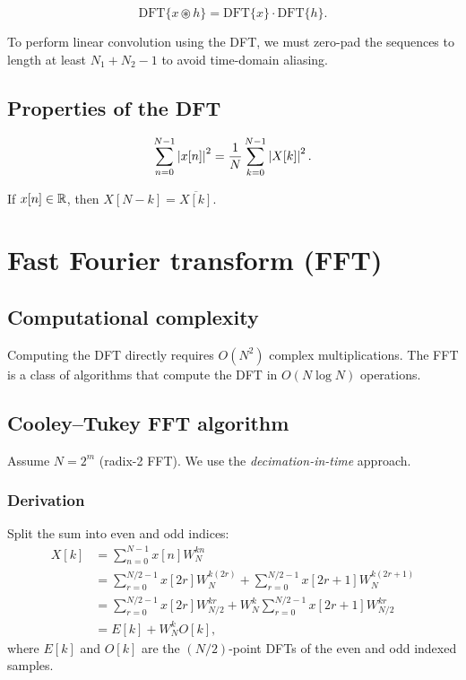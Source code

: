 \begin{notechapter}
\begin{theorem}\label{fourier-analysis:thm:circular-convolution}
\[
\text{DFT}\{x \circledast h\} = \text{DFT}\{x\} \cdot \text{DFT}\{h\}.
\]
\end{theorem}

\begin{remark}
To perform linear convolution using the DFT, we must zero-pad the sequences to length at least $N_1 + N_2 - 1$ to avoid time-domain aliasing.
\end{remark}

\subsection{Properties of the DFT}

\begin{proposition}
\[
\sum_{n=0}^{N-1} \left|x[n]\right|^2 = \frac{1}{N} \sum_{k=0}^{N-1} \left|X[k]\right|^2.
\]
\end{proposition}

\begin{proposition}
If $x[n] \in \mathbb{R}$, then $X[N-k] = \overline{X[k]}$.
\end{proposition}

\section{Fast Fourier transform (FFT)}

\subsection{Computational complexity}

Computing the DFT directly requires $O(N^2)$ complex multiplications. The FFT is a class of algorithms that compute the DFT in $O(N \log N)$ operations.

\subsection{Cooley--Tukey FFT algorithm}

Assume $N = 2^m$ (radix-2 FFT). We use the \emph{decimation-in-time} approach.

\subsubsection{Derivation}

Split the sum into even and odd indices:
\begin{align*}
X[k] &= \sum_{n=0}^{N-1} x[n] W_N^{kn} \\
&= \sum_{r=0}^{N/2-1} x[2r] W_N^{k(2r)} + \sum_{r=0}^{N/2-1} x[2r+1] W_N^{k(2r+1)} \\
&= \sum_{r=0}^{N/2-1} x[2r] W_{N/2}^{kr} + W_N^k \sum_{r=0}^{N/2-1} x[2r+1] W_{N/2}^{kr} \\
&= E[k] + W_N^k O[k],
\end{align*}
where $E[k]$ and $O[k]$ are the $(N/2)$-point DFTs of the even and odd indexed samples.


\end{notechapter}
